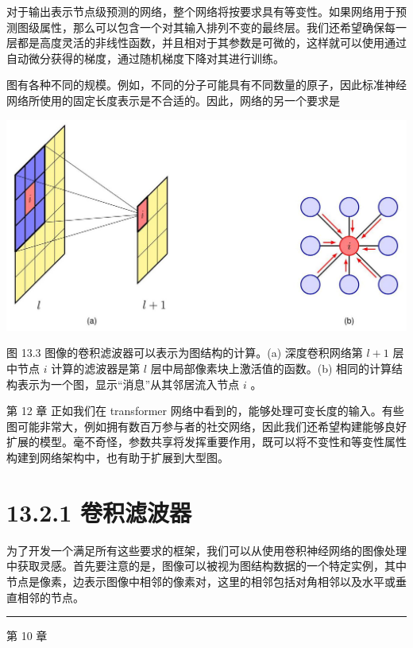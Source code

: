 \documentclass[10pt]{report}
\newcommand{\HRule}{\begin{center}\rule{0.9\linewidth}{0.2mm}\end{center}}
\begin{document}
对于输出表示节点级预测的网络，整个网络将按要求具有等变性。如果网络用于预测图级属性，那么可以包含一个对其输入排列不变的最终层。我们还希望确保每一层都是高度灵活的非线性函数，并且相对于其参数是可微的，这样就可以使用通过自动微分获得的梯度，通过随机梯度下降对其进行训练。

图有各种不同的规模。例如，不同的分子可能具有不同数量的原子，因此标准神经网络所使用的固定长度表示是不合适的。因此，网络的另一个要求是

\begin{center}
\includegraphics[max width=1.0\textwidth]{images/0194e279-9b28-703a-88f4-c3ac21e2010d_432_229_340_1339_706_0.jpg}
\end{center}
\hspace*{3em} 

图 13.3 图像的卷积滤波器可以表示为图结构的计算。(a) 深度卷积网络第 \(l + 1\) 层中节点 \(i\) 计算的滤波器是第 \(l\) 层中局部像素块上激活值的函数。(b) 相同的计算结构表示为一个图，显示“消息”从其邻居流入节点 \(i\) 。

第 12 章 正如我们在 transformer 网络中看到的，能够处理可变长度的输入。有些图可能非常大，例如拥有数百万参与者的社交网络，因此我们还希望构建能够良好扩展的模型。毫不奇怪，参数共享将发挥重要作用，既可以将不变性和等变性属性构建到网络架构中，也有助于扩展到大型图。

\section*{13.2.1 卷积滤波器}

为了开发一个满足所有这些要求的框架，我们可以从使用卷积神经网络的图像处理中获取灵感。首先要注意的是，图像可以被视为图结构数据的一个特定实例，其中节点是像素，边表示图像中相邻的像素对，这里的相邻包括对角相邻以及水平或垂直相邻的节点。

\HRule

第 10 章
\end{document}
